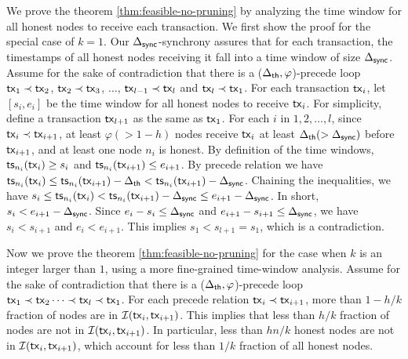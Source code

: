 We prove the theorem \ref{thm:feasible-no-pruning} by analyzing the time window for all honest nodes to receive each transaction. We first show the proof for the special case of $k=1$. Our $\Delta_{\mathsf{sync}}$-synchrony assures that for each transaction, the timestamps of all honest nodes receiving it fall into a time window of size $\Delta_{\mathsf{sync}}$. Assume for the sake of contradiction that there is a ($\Delta_{\mathsf{th}}, \varphi$)-precede loop $\mathsf{tx}_1\prec \mathsf{tx}_2$, $\mathsf{tx}_2\prec \mathsf{tx}_3$, $\ldots$, $\mathsf{tx}_{l-1}\prec \mathsf{tx}_l$ and $\mathsf{tx}_l\prec \mathsf{tx}_1$. For each transaction $\mathsf{tx}_i$, let $[s_i, e_i]$ be the time window for all honest nodes to receive $\mathsf{tx}_i$. For simplicity, define a transaction $\mathsf{tx}_{l+1}$ as the same as $\mathsf{tx}_1$. For each $i$ in $1,2,\dots, l$, since $\mathsf{tx}_i\prec\mathsf{tx}_{i+1}$, at least $\varphi(>1-h)$ nodes receive $\mathsf{tx}_i$ at least  $\Delta_{\mathsf{th}}(>\Delta_{\mathsf{sync}})$ before $\mathsf{tx}_{i+1}$, and at least one node $n_i$ is honest. By definition of the time windows, $\mathsf{ts}_{n_i}(\mathsf{tx}_i)\ge s_i$ and $\mathsf{ts}_{n_i}(\mathsf{tx}_{i+1})\le e_{i+1}$. By precede relation we have $\mathsf{ts}_{n_i}(\mathsf{tx}_i)\le \mathsf{ts}_{n_i}(\mathsf{tx}_{i+1})-\Delta_{\mathsf{th}} < \mathsf{ts}_{n_i}(\mathsf{tx}_{i+1})-\Delta_{\mathsf{sync}}$. Chaining the inequalities, we have $s_i\le \mathsf{ts}_{n_i}(\mathsf{tx}_i)<\mathsf{ts}_{n_i}(\mathsf{tx}_{i+1})-\Delta_{\mathsf{sync}} \le e_{i+1} - \Delta_{\mathsf{sync}}$. In short, $s_i<e_{i+1}-\Delta_{\mathsf{sync}}$. Since $e_i-s_i\le \Delta_{\mathsf{sync}}$ and $e_{i+1}-s_{i+1}\le \Delta_{\mathsf{sync}}$, we have $s_i<s_{i+1}$ and $e_i<e_{i+1}$. This implies $s_1<s_{l+1}=s_1$, which is a contradiction. 


Now we prove the theorem \ref{thm:feasible-no-pruning} for the case when $k$ is an integer larger than $1$, using a more fine-grained time-window analysis. Assume for the sake of contradiction that there is a ($\Delta_{\mathsf{th}}, \varphi$)-precede loop $\mathsf{tx}_1\prec \mathsf{tx}_2\cdots \prec \mathsf{tx}_l \prec \mathsf{tx}_1$. For each precede relation $\mathsf{tx}_i\prec \mathsf{tx}_{i+1}$, more than $1-h/k$ fraction of nodes are in $\mathcal{I}(\mathsf{tx}_{i}, \mathsf{tx}_{i+1})$. This implies that less than $h/k$ fraction of nodes are not in $\mathcal{I}(\mathsf{tx}_{i}, \mathsf{tx}_{i+1})$. In particular, less than $hn/k$ honest nodes are not in $\mathcal{I}(\mathsf{tx}_{i}, \mathsf{tx}_{i+1})$, which account for less than $1/k$ fraction of all honest nodes. 



